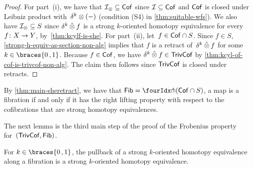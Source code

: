 \documentclass[reqno,10pt,a4paper,oneside,draft]{amsart}
\begin{document}
{{\begin{proof}
For part~(i), we have that $\cal{I}_\otimes \subseteq \Cof$ since $\cal{I} \subseteq \Cof$ and $\Cof$ is closed under Leibniz product with~$\kcyl \otimes (-)$ (condition (S4) in \cref{thm:suitable-wfs}). We also have $\cal{I}_\otimes \subseteq S$
since  $\kcyl \hatotimes f$ is a strong $k$-oriented homotopy equivalence for every $f \co X \to Y$, by~\cref{thm:kcylf-is-she}. 
For part~(ii), let~$f \in \Cof \cap S$.
Since $f \in S$, \cref{strong-h-equiv-as-section-non-alg} implies that $f$ is a retract of~$\kcyl \hatotimes f$ for some $k \in \braces{0\,, 1}$.
Because $f \in \Cof$, we have $\kcyl \hatotimes f \in \TrivCof$ by \cref{thm:kcyl-of-cof-is-trivcof-non-alg}. 
The claim then follows since $\TrivCof$ is closed under retracts.
\end{proof}

\begin{remark} \label{fib-and-she}
By \cref{thm:main-sheretract}, we have that $\Fib = \liftr{(\Cof \cap S)}$, \ie a map is a fibration if and only if it has the right lifting property with respect to the cofibrations that are strong homotopy equivalences.
\end{remark}

The next lemma is the third main step of the proof of the Frobenius property for~$(\TrivCof, \Fib)$.



\begin{lemma} \label{thm:non-alg-frobenius-she}
For $k \in \braces{0\,, 1}$, the pullback of a strong $k$-oriented homotopy equivalence along a fibration is  a strong $k$-oriented homotopy equivalence.
\end{lemma}

}}
\end{document}
